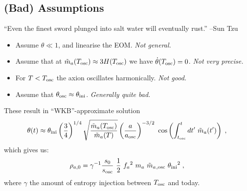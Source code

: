 \documentclass[10pt,utf8,compress,xcolor=dvipsnames]{beamer}
\begin{document}
\subsection{(Bad) Assumptions}
\begin{frame}{\insertsubsectionhead}



	\begin{center}
		``Even the finest sword plunged into salt water will eventually rust.''
		\flushright --Sun Tzu %
	\end{center}

%		
	\begin{itemize}
		\item Assume $\theta \ll 1$, and linearise the EOM. {\sl Not general.}
		\item Assume that at $\tilde m_{a}{}(T_{\rm osc}{}) \approx 3H(T_{\rm osc}{})$ we have $\dot\theta(T_{\rm osc}{})=0$. {\sl Not very precise.}
		\item For $T<T_{\rm osc}{}$ the axion oscillates harmonically. {\sl Not good.}
		\item Assume that $\theta_{\rm osc}{} \approx \theta_{\rm ini}{}$. {\sl Generally quite bad.}\pause
	\end{itemize}
	
	These result in ``WKB''-approximate solution
	\begin{equation*}\vspace*{-0.2cm}
		\theta(t) \approx \thetai \lrb{\dfrac{3}{4}}^{1/4} \sqrt{ \dfrac{ \maT(\Tosc) }{\maT(T)} } \lrb{\dfrac{a}{\aosc}}^{-3/2} \  \cos\lrb{ \int_{\tosc}^t d t^\prime  \ \maT(t^\prime)}   \;,
	\end{equation*}
	which gives us:
	\begin{equation*}\vspace*{-0.2cm}		
		\rho_{a,0} = \gamma^{-1}  \dfrac{s_0}{s_{\rm osc}} \  \dfrac{1 }{2}  \ \fa^2 \ \ma \ \maT_{,{\rm osc}} \ \thetai^2    \;,
	\end{equation*}
	where $\gamma$ the amount of entropy injection between $T_{\rm osc}{}$ and today.%
\end{frame}
\end{document}
